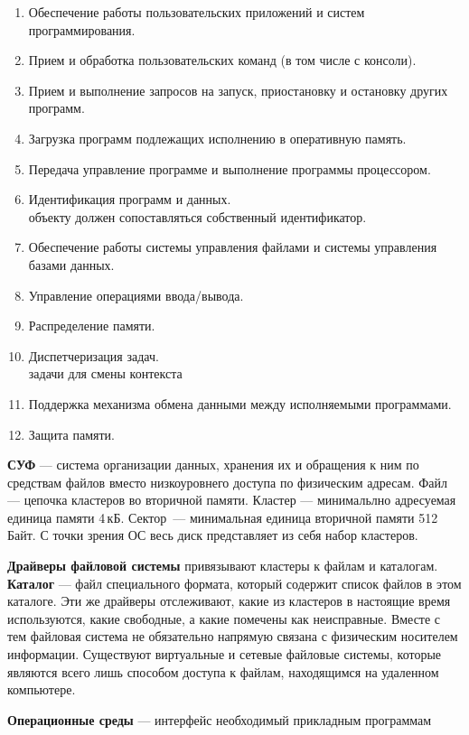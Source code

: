 \begin{enumerate}
	\item Обеспечение работы пользовательских приложений и систем
		программирования.
	\item Прием и обработка пользовательских команд (в том числе с консоли).
	\item Прием и выполнение запросов на запуск, приостановку и остановку других
		программ.
	\item Загрузка программ подлежащих исполнению в оперативную память.
	\item Передача управление программе и выполнение программы процессором.
	\item Идентификация программ и данных.\\{ объекту должен
		сопоставляться собственный идентификатор.}
	\item Обеспечение работы системы управления файлами и системы управления
		базами данных.
	\item Управление операциями ввода/вывода.
	\item Распределение памяти.
	\item Диспетчеризация задач.\\{ задачи для смены контекста}
	\item Поддержка механизма обмена данными между исполняемыми программами.
	\item Защита памяти.
\end{enumerate}\par
\textbf{СУФ} --- система организации данных, хранения их и обращения к ним по
средствам файлов вместо низкоуровнего доступа по физическим адресам. Файл ---
цепочка кластеров во вторичной памяти. Кластер --- минимальлно адресуемая 
единица памяти 4\,кБ. Сектор~--- минимальная единица вторичной памяти
512\,Байт. С точки зрения ОС весь диск представляет из себя набор кластеров.\par
\textbf{Драйверы файловой системы} привязывают кластеры к файлам и
каталогам. \textbf{Каталог} --- файл специального формата, который содержит
список файлов в этом каталоге. Эти же драйверы отслеживают, какие из кластеров в
настоящие время используются, какие свободные, а какие помечены как неисправные.
Вместе с тем файловая система не обязательно напрямую связана с физическим
носителем информации. Существуют виртуальные и сетевые файловые системы, которые
являются всего лишь способом доступа к файлам, находящимся на удаленном
компьютере.\par
\textbf{Операционные среды} --- интерфейс необходимый прикладным программам
